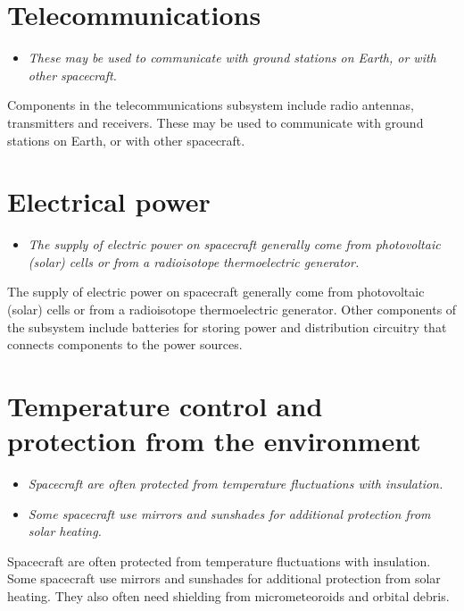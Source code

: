 \section{Telecommunications}\label{telecommunications}

\begin{itemize}
\item
  \emph{These may be used to communicate with ground stations on Earth,
  or with other spacecraft.}
\end{itemize}

Components in the telecommunications subsystem include radio antennas,
transmitters and receivers. These may be used to communicate with ground
stations on Earth, or with other spacecraft.

\section{Electrical power}\label{electrical-power}

\begin{itemize}
\item
  \emph{The supply of electric power on spacecraft generally come from
  photovoltaic (solar) cells or from a radioisotope thermoelectric
  generator.}
\end{itemize}

The supply of electric power on spacecraft generally come from
photovoltaic (solar) cells or from a radioisotope thermoelectric
generator. Other components of the subsystem include batteries for
storing power and distribution circuitry that connects components to the
power sources.

\section{Temperature control and protection from the
environment}\label{temperature-control-and-protection-from-the-environment}

\begin{itemize}
\item
  \emph{Spacecraft are often protected from temperature fluctuations
  with insulation.}
\item
  \emph{Some spacecraft use mirrors and sunshades for additional
  protection from solar heating.}
\end{itemize}

Spacecraft are often protected from temperature fluctuations with
insulation. Some spacecraft use mirrors and sunshades for additional
protection from solar heating. They also often need shielding from
micrometeoroids and orbital debris.


